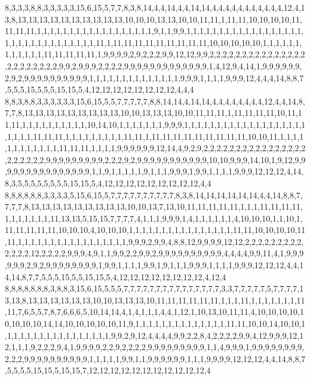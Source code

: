 8,3,3,3,8,8,3,3,3,3,3,15,6,15,5,7,7,8,3,8,14,4,4,14,4,4,14,14,4,4,4,4,4,4,4,4,4,4,4,12,4,13,8,13,13,13,13,13,13,13,13,13,13,10,10,10,13,13,10,10,11,11,1,11,11,10,10,10,10,11,11,11,11,1,1,1,1,1,1,1,1,1,1,1,1,1,1,1,1,1,1,9,1,1,9,9,1,1,1,1,1,1,1,1,1,1,1,1,1,1,1,1,1,1,1,1,1,1,1,1,1,1,1,1,1,1,1,1,11,1,11,11,11,11,11,11,11,11,11,10,10,10,10,10,1,1,1,1,1,1,1,1,1,1,1,1,11,11,11,11,11,1,9,9,9,9,2,9,2,2,2,9,9,12,12,9,9,2,2,2,2,2,2,2,2,2,2,2,2,2,2,2,2,2,2,2,2,2,2,2,9,9,2,9,9,9,2,2,2,2,9,9,9,9,9,9,9,9,9,9,9,9,9,1,4,12,9,4,14,1,9,9,9,9,9,9,2,9,2,9,9,9,9,9,9,9,9,9,9,1,1,1,1,1,1,1,1,1,1,1,1,1,1,9,9,9,1,1,1,1,9,9,9,12,4,4,4,14,8,8,7,5,5,5,15,5,5,5,15,15,5,4,12,12,12,12,12,12,12,12,4,4,4
8,8,3,8,8,3,3,3,3,3,3,15,6,15,5,5,7,7,7,7,7,8,8,14,14,4,14,14,4,4,4,4,4,4,4,4,12,4,4,14,8,7,7,8,13,13,13,13,13,13,13,13,13,10,10,13,13,13,10,10,11,11,11,1,11,11,11,11,10,11,11,11,1,1,1,1,1,1,1,1,1,1,10,14,10,1,1,1,1,1,1,1,9,9,9,1,1,1,1,1,1,1,1,1,1,1,1,1,1,1,1,1,1,1,1,1,1,1,11,11,11,1,1,1,1,1,1,1,1,1,11,11,1,11,11,11,11,11,11,11,11,11,10,10,11,1,1,1,1,1,1,1,1,1,1,1,1,11,11,11,1,1,1,1,9,9,9,9,9,9,12,14,4,9,2,9,2,2,2,2,2,2,2,2,2,2,2,2,2,2,2,2,2,2,2,2,2,2,9,9,9,9,9,9,9,9,9,2,2,2,9,2,9,9,9,9,9,9,9,9,9,9,9,10,10,9,9,9,14,10,1,9,12,9,9,9,9,9,9,9,9,9,9,9,9,9,9,9,1,1,9,1,1,1,1,1,9,1,1,1,9,9,9,1,9,9,1,1,1,1,9,9,9,12,12,12,4,14,8,3,5,5,5,5,5,5,5,5,15,15,5,4,12,12,12,12,12,12,12,12,12,4,4
8,8,8,8,8,8,3,3,3,3,5,15,6,15,5,7,7,7,7,7,7,7,7,7,7,8,3,8,14,14,14,14,14,14,4,4,14,8,8,7,7,7,7,8,13,13,13,13,13,13,13,13,13,10,10,13,7,13,10,11,11,11,11,11,1,1,1,11,11,11,11,1,1,1,1,1,1,1,11,13,13,5,15,15,7,7,7,7,4,1,1,1,9,9,9,1,4,1,1,1,1,1,1,4,10,10,10,1,1,10,1,11,11,11,11,11,10,10,10,4,10,10,10,1,1,1,1,1,1,1,1,1,1,1,1,1,1,1,1,11,11,10,10,10,10,11,11,1,1,1,1,1,1,1,1,1,1,1,1,1,1,1,1,1,9,9,9,2,9,9,4,8,8,12,9,9,9,9,12,12,2,2,2,2,2,2,2,2,2,2,2,2,2,12,2,2,2,2,9,9,9,4,9,1,1,9,9,2,2,9,9,2,9,9,9,9,9,9,9,9,9,9,4,4,4,4,9,9,11,4,1,9,9,9,9,9,9,2,9,2,9,9,9,9,9,9,9,9,1,9,9,1,1,1,1,9,9,1,9,1,1,1,9,9,9,1,1,1,1,9,9,9,12,12,12,4,4,14,14,8,7,7,5,5,5,15,5,5,15,15,5,4,12,12,12,12,12,12,12,12,4,12,4
8,8,8,8,8,8,8,3,8,8,3,15,6,15,5,5,5,7,7,7,7,7,7,7,7,7,7,7,7,7,7,7,3,3,7,7,7,7,7,5,7,7,7,7,13,13,8,13,13,13,13,13,13,10,10,13,13,13,10,11,11,11,11,11,11,1,1,1,11,1,1,1,1,1,1,1,11,11,7,6,5,5,7,8,7,6,6,6,5,10,14,14,4,1,4,1,1,1,4,4,1,12,1,10,13,10,11,11,4,10,10,10,10,10,10,10,10,14,14,10,10,10,10,10,11,9,1,1,1,1,1,1,1,1,1,1,1,1,1,1,11,11,10,10,14,10,10,1,1,1,1,1,1,1,1,1,1,1,1,1,1,1,1,1,9,9,2,9,12,4,4,4,4,9,9,2,2,8,4,2,2,2,2,9,9,4,12,9,9,9,12,12,1,1,1,9,2,2,2,9,4,1,9,9,9,9,2,2,9,2,2,2,2,9,9,9,9,9,9,9,9,9,1,1,4,9,9,9,1,9,9,9,9,9,9,9,9,2,2,2,9,9,9,9,9,9,9,9,9,9,1,1,1,1,1,9,9,1,1,9,9,9,9,9,9,1,1,1,9,9,9,9,12,12,12,4,4,14,8,8,7,5,5,5,5,15,15,5,15,15,7,12,12,12,12,12,12,12,12,12,12,12,4
